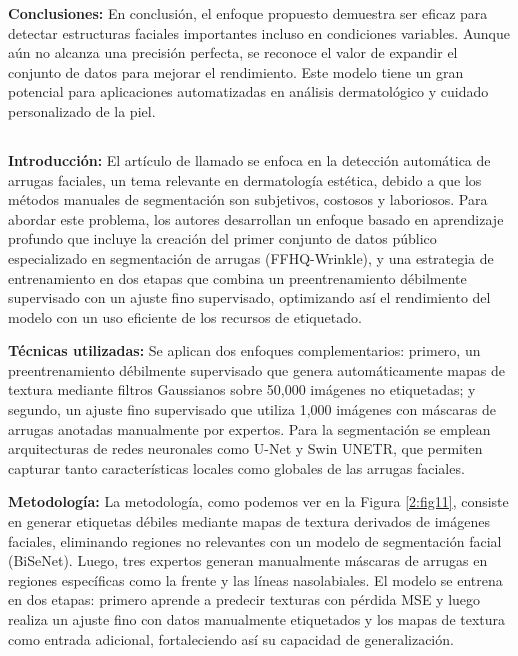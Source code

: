 \textbf{Conclusiones:}
En conclusión, el enfoque propuesto demuestra ser eficaz para detectar estructuras faciales importantes incluso en condiciones variables. Aunque aún no alcanza una precisión perfecta, se reconoce el valor de expandir el conjunto de datos para mejorar el rendimiento. Este modelo tiene un gran potencial para aplicaciones automatizadas en análisis dermatológico y cuidado personalizado de la piel.

\subsection{}

\textbf{Introducción:}
El artículo de \cite{moon2024dermatology} llamado  se enfoca en la detección automática de arrugas faciales, un tema relevante en dermatología estética, debido a que los métodos manuales de segmentación son subjetivos, costosos y laboriosos. Para abordar este problema, los autores desarrollan un enfoque basado en aprendizaje profundo que incluye la creación del primer conjunto de datos público especializado en segmentación de arrugas (FFHQ-Wrinkle), y una estrategia de entrenamiento en dos etapas que combina un preentrenamiento débilmente supervisado con un ajuste fino supervisado, optimizando así el rendimiento del modelo con un uso eficiente de los recursos de etiquetado.

\textbf{Técnicas utilizadas:}
Se aplican dos enfoques complementarios: primero, un preentrenamiento débilmente supervisado que genera automáticamente mapas de textura mediante filtros Gaussianos sobre 50,000 imágenes no etiquetadas; y segundo, un ajuste fino supervisado que utiliza 1,000 imágenes con máscaras de arrugas anotadas manualmente por expertos. Para la segmentación se emplean arquitecturas de redes neuronales como U-Net y Swin UNETR, que permiten capturar tanto características locales como globales de las arrugas faciales.

\textbf{Metodología:}
La metodología, como podemos ver en la Figura \ref{2:fig11}, consiste en generar etiquetas débiles mediante mapas de textura derivados de imágenes faciales, eliminando regiones no relevantes con un modelo de segmentación facial (BiSeNet). Luego, tres expertos generan manualmente máscaras de arrugas en regiones específicas como la frente y las líneas nasolabiales. El modelo se entrena en dos etapas: primero aprende a predecir texturas con pérdida MSE y luego realiza un ajuste fino con datos manualmente etiquetados y los mapas de textura como entrada adicional, fortaleciendo así su capacidad de generalización.

